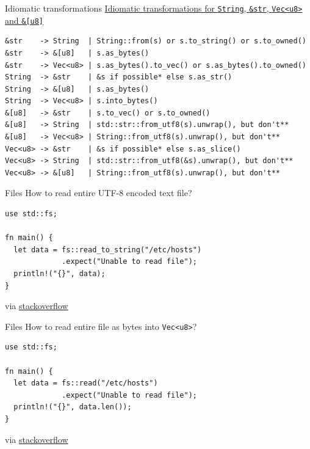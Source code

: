 \documentclass{beamer}
\begin{document}
\begin{frame}[fragile]{Idiomatic transformations}
  \href{https://stackoverflow.com/a/41034751}{Idiomatic transformations for \texttt{String}, \texttt{&str}, \texttt{Vec<u8>} and \texttt{&[u8]}}

  \begin{verbatim}
&str    -> String  | String::from(s) or s.to_string() or s.to_owned()
&str    -> &[u8]   | s.as_bytes()
&str    -> Vec<u8> | s.as_bytes().to_vec() or s.as_bytes().to_owned()
String  -> &str    | &s if possible* else s.as_str()
String  -> &[u8]   | s.as_bytes()
String  -> Vec<u8> | s.into_bytes()
&[u8]   -> &str    | s.to_vec() or s.to_owned()
&[u8]   -> String  | std::str::from_utf8(s).unwrap(), but don't**
&[u8]   -> Vec<u8> | String::from_utf8(s).unwrap(), but don't**
Vec<u8> -> &str    | &s if possible* else s.as_slice()
Vec<u8> -> String  | std::str::from_utf8(&s).unwrap(), but don't**
Vec<u8> -> &[u8]   | String::from_utf8(s).unwrap(), but don't**
  \end{verbatim}
\end{frame}


\begin{frame}[fragile]{Files}
  How to read entire UTF-8 encoded text file?
  \begin{verbatim}
use std::fs;

fn main() {
  let data = fs::read_to_string("/etc/hosts")
             .expect("Unable to read file");
  println!("{}", data);
}
  \end{verbatim}
  via \href{https://stackoverflow.com/a/31193386}{stackoverflow}
\end{frame}

\begin{frame}[fragile]{Files}
  How to read entire file as bytes into \texttt{Vec<u8>}?
  \begin{verbatim}
use std::fs;

fn main() {
  let data = fs::read("/etc/hosts")
             .expect("Unable to read file");
  println!("{}", data.len());
}
  \end{verbatim}
  via \href{https://stackoverflow.com/a/31193386}{stackoverflow}
\end{frame}
\end{document}
